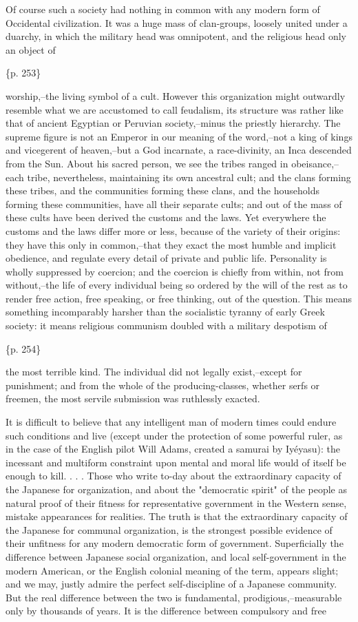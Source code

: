 Of course such a society had nothing in common with any modern form of Occidental civilization. It was a huge mass of clan-groups, loosely united under a duarchy, in which the military head was omnipotent, and the religious head only an object of

\{p. 253\}

worship,--the living symbol of a cult. However this organization might outwardly resemble what we are accustomed to call feudalism, its structure was rather like that of ancient Egyptian or Peruvian society,--minus the priestly hierarchy. The supreme figure is not an Emperor in our meaning of the word,--not a king of kings and vicegerent of heaven,--but a God incarnate, a race-divinity, an Inca descended from the Sun. About his sacred person, we see the tribes ranged in obeisance,--each tribe, nevertheless, maintaining its own ancestral cult; and the clans forming these tribes, and the communities forming these clans, and the households forming these communities, have all their separate cults; and out of the mass of these cults have been derived the customs and the laws. Yet everywhere the customs and the laws differ more or less, because of the variety of their origins: they have this only in common,--that they exact the most humble and implicit obedience, and regulate every detail of private and public life. Personality is wholly suppressed by coercion; and the coercion is chiefly from within, not from without,--the life of every individual being so ordered by the will of the rest as to render free action, free speaking, or free thinking, out of the question. This means something incomparably harsher than the socialistic tyranny of early Greek society: it means religious communism doubled with a military despotism of

\{p. 254\}

the most terrible kind. The individual did not legally exist,--except for punishment; and from the whole of the producing-classes, whether serfs or freemen, the most servile submission was ruthlessly exacted.

It is difficult to believe that any intelligent man of modern times could endure such conditions and live (except under the protection of some powerful ruler, as in the case of the English pilot Will Adams, created a samurai by Iyéyasu): the incessant and multiform constraint upon mental and moral life would of itself be enough to kill. . . . Those who write to-day about the extraordinary capacity of the Japanese for organization, and about the "democratic spirit" of the people as natural proof of their fitness for representative government in the Western sense, mistake appearances for realities. The truth is that the extraordinary capacity of the Japanese for communal organization, is the strongest possible evidence of their unfitness for any modern democratic form of government. Superficially the difference between Japanese social organization, and local self-government in the modern American, or the English colonial meaning of the term, appears slight; and we may, justly admire the perfect self-discipline of a Japanese community. But the real difference between the two is fundamental, prodigious,--measurable only by thousands of years. It is the difference between compulsory and free

